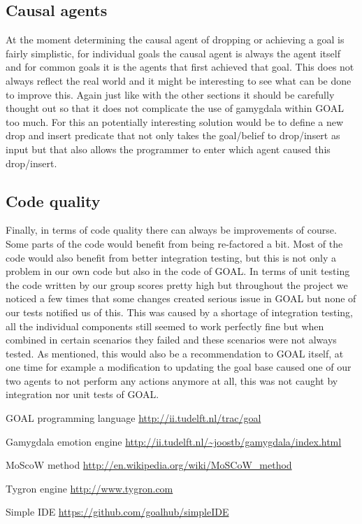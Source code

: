 \documentclass[]{article}
\begin{document}
\subsection{Causal agents}
At the moment determining the causal agent of dropping or achieving a goal is fairly simplistic, for individual goals the causal agent is always the agent itself and for common goals it is the agents that first achieved that goal. This does not always reflect the real world and it might be interesting to see what can be done to improve this. Again just like with the other sections it should be carefully thought out so that it does not complicate the use of gamygdala within GOAL too much. For this an potentially interesting solution would be to define a new drop and insert predicate that not only takes the goal/belief to drop/insert as input but that also allows the programmer to enter which agent caused this drop/insert.

\subsection{Code quality}
Finally, in terms of code quality there can always be improvements of course. Some parts of the code would benefit from being re-factored a bit. Most of the code would also benefit from better integration testing, but this is not only a problem in our own code but also in the code of GOAL. In terms of unit testing the code written by our group scores pretty high but throughout the project we noticed a few times that some changes created serious issue in GOAL but none of our tests notified us of this. This was caused by a shortage of integration testing, all the individual components still seemed to work perfectly fine but when combined in certain scenarios they failed and these scenarios were not always tested. As mentioned, this would also be a recommendation to GOAL itself, at one time for example a modification to updating the goal base caused one of our two agents to not perform any actions anymore at all, this was not caught by integration nor unit tests of GOAL.

\clearpage
\printglossaries


\begin{thebibliography}{9}
	
	GOAL programming language
	\url{http://ii.tudelft.nl/trac/goal}
	
	Gamygdala emotion engine
	\url{http://ii.tudelft.nl/~joostb/gamygdala/index.html}
	
	MoScoW method
	\url{http://en.wikipedia.org/wiki/MoSCoW_method }
	
	Tygron engine
	\url{http://www.tygron.com }
	
	Simple IDE
	\url{https://github.com/goalhub/simpleIDE }
	
	
\end{thebibliography}
\end{document}
